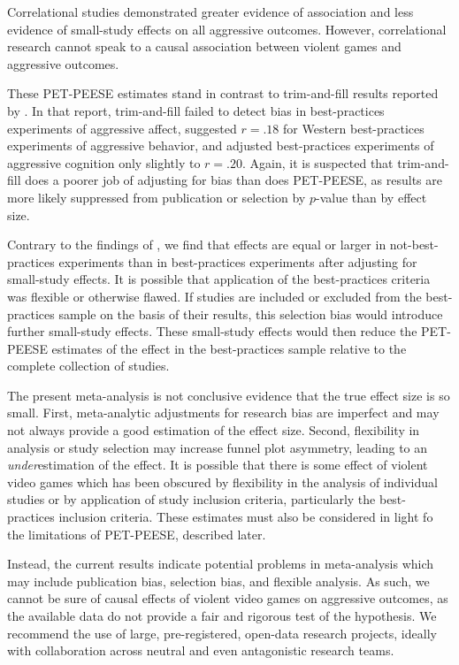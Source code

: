 \documentclass[man]{apa6}
\begin{document}
Correlational studies demonstrated greater evidence of association and less evidence of small-study effects on all aggressive outcomes. However, correlational research cannot speak to a causal association between violent games and aggressive outcomes. 

These PET-PEESE estimates stand in contrast to trim-and-fill results reported by \citet{Anderson:etal:2010}. In that report, trim-and-fill failed to detect bias in best-practices experiments of aggressive affect, suggested $r = .18$ for Western best-practices experiments of aggressive behavior, and adjusted best-practices experiments of aggressive cognition only slightly to $r = .20$. Again, it is suspected that trim-and-fill does a poorer job of adjusting for bias than does PET-PEESE, as results are more likely suppressed from publication or selection by $p$-value than by effect size. %

Contrary to the findings of \citet{Anderson:etal:2010}, we find that effects are equal or larger in not-best-practices experiments than in best-practices experiments after adjusting for small-study effects. It is possible that application of the best-practices criteria was flexible or otherwise flawed. If studies are included or excluded from the best-practices sample on the basis of their results, this selection bias would introduce further small-study effects. These small-study effects would then reduce the PET-PEESE estimates of the effect in the best-practices sample relative to the complete collection of studies.

The present meta-analysis is not conclusive evidence that the true effect size is so small. First, meta-analytic adjustments for research bias are imperfect and may not always provide a good estimation of the effect size. Second, flexibility in analysis or study selection may increase funnel plot asymmetry, leading to an {\em under}estimation of the effect. %
It is possible that there is some effect of violent video games which has been obscured by flexibility in the analysis of individual studies or by application of study inclusion criteria, particularly the best-practices inclusion criteria. These estimates must also be considered in light fo the limitations of PET-PEESE, described later.

Instead, the current results indicate potential problems in meta-analysis which may include publication bias, selection bias, and flexible analysis. As such, we cannot be sure of causal effects of violent video games on aggressive outcomes, as the available data do not provide a fair and rigorous test of the hypothesis. We recommend the use of large, pre-registered, open-data research projects, ideally with collaboration across neutral and even antagonistic research teams. 
\end{document}

